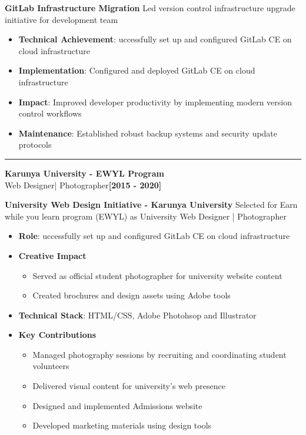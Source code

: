 \documentclass[letterpaper,10pt]{article}
\newcommand{\timelineEntry}[3]{%
	\noindent\color{accent}\large\textbf{#1}\\
	{\color{accent}#2}\hfill\textbf{\color{accent}\small[#3]}
	\newline\newline
}
\newcommand{\texthr}[1]{%
	\begin{center}
	\rule{2cm}{0.4pt}
	\end{center}
}
\begin{document}
\vspace{0.4em}\noindent\large\textbf{GitLab Infrastructure Migration}\newline
\noindent Led version control infrastructure upgrade initiative for development team
\begin{itemize}[leftmargin=*, nosep, itemsep=0.4em, before=\vspace{0.6em}, after=\vspace{0.8em}, label={}]
	\item \textbf{Technical Achievement}: uccessfully set up and configured GitLab CE on cloud infrastructure
	\item \textbf{Implementation}: Configured and deployed GitLab CE on cloud infrastructure
	\item \textbf{Impact}: Improved developer productivity by implementing modern version control workflows
	\item \textbf{Maintenance}: Established robust backup systems and security update protocols
\end{itemize}

\texthr{}

\timelineEntry{Karunya University - EWYL Program}{Web Designer| Photographer}{2015 - 2020}
\vspace{0.4em}\noindent\large\textbf{University Web Design Initiative - Karunya University}\newline
\noindent Selected for Earn while you learn program (EWYL)  as University Web Designer | Photographer
\begin{itemize}[leftmargin=*, nosep, itemsep=0.4em, before=\vspace{0.6em}, after=\vspace{0.8em}, label={}]
	\item \textbf{Role}: uccessfully set up and configured GitLab CE on cloud infrastructure
	\item \textbf{Creative Impact}
	\begin{itemize}
		\item Served as official student photographer for university website content
		\item Created brochures and design assets using Adobe tools
	\end{itemize}
	\item \textbf{Technical Stack}: HTML/CSS, Adobe Photohsop and Illustrator
	\item \textbf{Key Contributions}
	\begin{itemize}
		\item Managed photography sessions by recruiting and coordinating student volunteers
		\item Delivered visual content for university's web presence
		\item Designed and implemented Admissions website
		\item Developed marketing materials using design tools
	\end{itemize}
\end{itemize}
\end{document}

